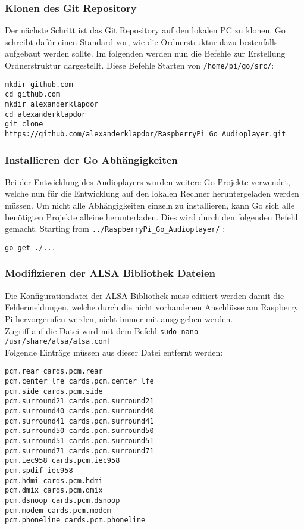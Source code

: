 \subsubsection{Klonen des Git Repository}
Der nächste Schritt ist das Git Repository auf den lokalen PC zu klonen. Go
schreibt dafür einen Standard vor, wie die Ordnerstruktur dazu bestenfalls
aufgebaut werden sollte. Im folgenden werden nun die Befehle zur Erstellung
Ordnerstruktur dargestellt. Diese Befehle Starten von \verb|/home/pi/go/src/|:
\begin{lstlisting}[caption={Klonen des Git Repository}]
mkdir github.com 
cd github.com
mkdir alexanderklapdor
cd alexanderklapdor
git clone https://github.com/alexanderklapdor/RaspberryPi_Go_Audioplayer.git
\end{lstlisting}

\subsubsection{Installieren der Go Abhängigkeiten}
Bei der Entwicklung des Audioplayers wurden weitere Go-Projekte verwendet,
welche nun für die Entwicklung auf den lokalen Rechner heruntergeladen werden
müssen. Um nicht alle Abhängigkeiten einzeln zu installieren, kann Go sich alle
benötigten Projekte alleine herunterladen. Dies wird durch den folgenden Befehl
gemacht.
Starting from \verb|../RaspberryPi_Go_Audioplayer/| :
\begin{lstlisting}
go get ./... 
\end{lstlisting}

\subsubsection{Modifizieren der ALSA Bibliothek Dateien}
Die Konfigurationdatei der ALSA Bibliothek muss editiert werden damit die
Fehlermeldungen, welche durch die nicht vorhandenen Anschlüsse am Raspberry Pi
hervorgerufen werden, nicht immer mit ausgegeben werden. \\
Zugriff auf die Datei wird mit dem Befehl \verb|sudo nano /usr/share/alsa/alsa.conf|  \\
Folgende Einträge müssen aus dieser Datei entfernt werden:
\begin{lstlisting}[caption={Liste der zu löschenden Einträge}]
pcm.rear cards.pcm.rear 
pcm.center_lfe cards.pcm.center_lfe 
pcm.side cards.pcm.side 
pcm.surround21 cards.pcm.surround21 
pcm.surround40 cards.pcm.surround40 
pcm.surround41 cards.pcm.surround41 
pcm.surround50 cards.pcm.surround50 
pcm.surround51 cards.pcm.surround51 
pcm.surround71 cards.pcm.surround71 
pcm.iec958 cards.pcm.iec958 
pcm.spdif iec958 
pcm.hdmi cards.pcm.hdmi 
pcm.dmix cards.pcm.dmix 
pcm.dsnoop cards.pcm.dsnoop 
pcm.modem cards.pcm.modem 
pcm.phoneline cards.pcm.phoneline
\end{lstlisting}

